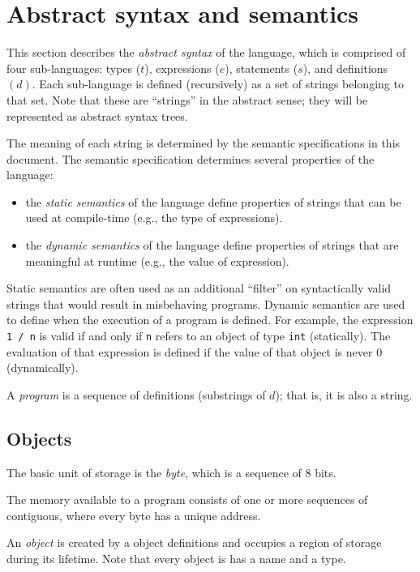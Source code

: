 \documentclass[11pt]{article}
\makeatletter
\newcommand{\code}[1]{\lstinline @#1@}
\makeatother
\begin{document}
\section{Abstract syntax and semantics}

This section describes the \emph{abstract syntax} of the language, which is comprised of four sub-languages: types ($t$), expressions ($e$), statements ($s$), and definitions $(d)$.
Each sub-language is defined (recursively) as a set of strings belonging to that set.
Note that these are ``strings'' in the abstract sense; they will be represented as abstract syntax trees.

The meaning of each string is determined by the semantic specifications in this document. 
The semantic specification determines several properties of the language:
\begin{itemize}
\item the \emph{static semantics} of the language define properties of
strings that can be used at compile-time (e.g., the type of expressions).
\item the \emph{dynamic semantics} of the language define properties of
strings that are meaningful at runtime (e.g., the value of expression).
\end{itemize}
Static semantics are often used as an additional ``filter'' on syntactically 
valid strings that would result in misbehaving programs.
Dynamic semantics are used to define when the execution of a program is
defined.
For example, the expression \code{1 / n} is valid if and only if \code{n} refers 
to an object of type \code{int} (statically). 
The evaluation of that expression is defined if the value of that object is 
never 0 (dynamically).

A \emph{program} is a sequence of definitions (substrings of $d$); that is,
it is also a string.

\subsection{Objects}

The basic unit of storage is the \emph{byte}, which is a sequence of 8 bits.

The memory available to a program consists of one or more sequences of 
contiguous, where every byte has a unique address.

An \emph{object} is created by a object definitions and occupies a region of 
storage during its lifetime. Note that every object is has a name and a type.
\end{document}
